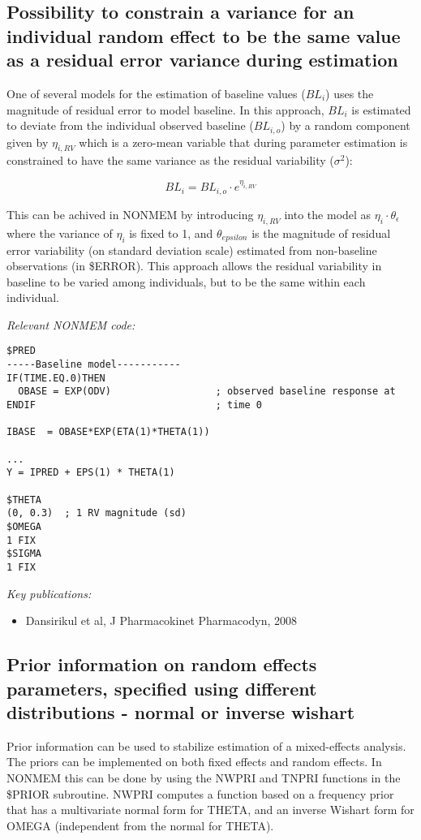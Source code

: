 \documentclass[a4paper,11pt]{article}
\begin{document}
\subsection{Possibility to constrain a variance for an individual
  random effect to be the same value as a residual error variance
  during estimation}

One of several models for the estimation of baseline values ($BL_i$)
uses the magnitude of residual error to model baseline. In this
approach, $BL_i$ is estimated to deviate from the individual observed
baseline ($BL_{i,o}$) by a random component given by $\eta_{i,RV}$ which
is a zero-mean variable that during parameter estimation is
constrained to have the same variance as the residual variability ($\sigma^2$):

\begin{equation}
BL_i = BL_{i,o} \cdot e^{\eta_{i,RV}}
\end{equation}

This can be achived in NONMEM by introducing $\eta_{i,RV}$ into the
model as $\eta_{i}\cdot \theta_\epsilon$ where the variance of
$\eta_i$ is fixed to 1, and $\theta_{epsilon}$ is the magnitude of
residual error variability (on standard deviation scale) estimated
from non-baseline observations (in \$ERROR). This approach allows the
residual variability in baseline to be varied among individuals, but
to be the same within each individual.

\vspace{10pt}
\noindent \emph{Relevant NONMEM code:}
\begin{lstlisting}
$PRED
-----Baseline model-----------
IF(TIME.EQ.0)THEN
  OBASE = EXP(ODV)                  ; observed baseline response at
ENDIF                               ; time 0

IBASE  = OBASE*EXP(ETA(1)*THETA(1))

...
Y = IPRED + EPS(1) * THETA(1)

$THETA
(0, 0.3)  ; 1 RV magnitude (sd)
$OMEGA
1 FIX
$SIGMA
1 FIX
\end{lstlisting}

\noindent \emph{Key publications:}
\begin{itemize}
\item Dansirikul et al, J Pharmacokinet Pharmacodyn, 2008
\end{itemize}

\subsection{Prior information on random effects parameters, specified
  using different distributions - normal or inverse wishart}
Prior information can be used to stabilize estimation of a
mixed-effects analysis. The priors can be implemented on both fixed
effects and random effects. In NONMEM this can be done by using the
NWPRI and TNPRI functions in the \$PRIOR subroutine. NWPRI computes a
function based on a frequency prior that has a multivariate normal
form for THETA, and an inverse Wishart form for OMEGA (independent
from the normal for THETA).
\end{document}
